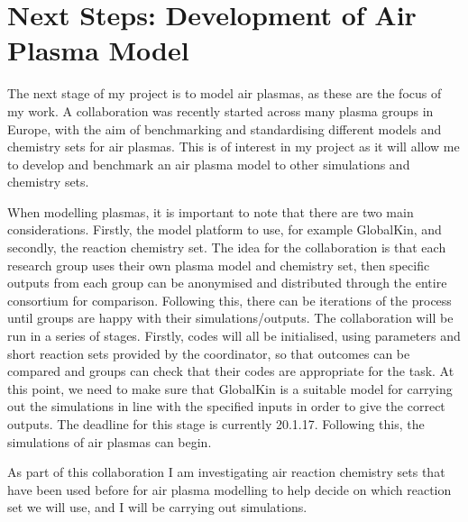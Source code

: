\documentclass[11pt, oneside]{article}   	%
\begin{document}
\section{Next Steps: Development of Air Plasma Model}

The next stage of my project is to model air plasmas, as these are the focus of my work.
A collaboration was recently started across many plasma groups in Europe, with the aim of benchmarking and standardising different models and chemistry sets for air plasmas.
This is of interest in my project as it will allow me to develop and benchmark an air plasma model to other simulations and chemistry sets.

When modelling plasmas, it is important to note that there are two main considerations.
Firstly, the model platform to use, for example GlobalKin, and secondly, the reaction chemistry set.
The idea for the collaboration is that each research group uses their own plasma model and chemistry set, then specific outputs from each group can be anonymised and distributed through the entire consortium for comparison.
Following this, there can be iterations of the process until groups are happy with their simulations/outputs.
The collaboration will be run in a series of stages.
Firstly, codes will all be initialised, using parameters and short reaction sets provided by the coordinator, so that outcomes can be compared and groups can check that their codes are appropriate for the task.
At this point, we need to make sure that GlobalKin is a suitable model for carrying out the simulations in line with the specified inputs in order to give the correct outputs.
The deadline for this stage is currently 20.1.17.
Following this, the simulations of air plasmas can begin.

As part of this collaboration I am investigating air reaction chemistry sets that have been used before for air plasma modelling to help decide on which reaction set we will use, and I will be carrying out simulations.


\end{document}
